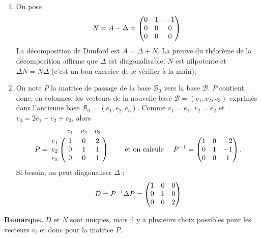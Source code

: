 \documentclass[12pt, class=report,crop=false]{standalone}
\begin{document}
\begin{exemple}
\begin{enumerate}
  \item  On pose 
  $$N = A - \Delta
  = \begin{pmatrix}0&1&-1\cr 0&0&0\cr 0&0&0\end{pmatrix}.$$
  La décomposition de Dunford est $A = \Delta + N$. 
  La preuve du théorème de la décomposition affirme que $\Delta$ est diagonalisable,
  $N$ est nilpotente et $\Delta N = N \Delta$ (c'est un bon exercice de le vérifier
  à la main).
  
  \item On note $P$ la matrice de passage de la base $\mathcal{B}_0$ vers la base $\mathcal{B}$. $P$ contient donc, en colonnes, les vecteurs de la nouvelle base $\mathcal{B} = (v_1,v_2,v_3)$ exprimés dans l'ancienne base 
 $\mathcal{B}_0 = (e_1,e_2,e_3)$.  Comme
 $v_1 = e_1$, $v_2 = e_2$ et $v_3 =  2e_1+e_2+e_3$, alors
 $$P=\bordermatrix{
    &v_1&v_2&v_3\cr
 e_1&1&0&2\cr  
 e_2&0&1&1\cr 
 e_3&0&0&1}\qquad \text{ et on calcule } \quad P^{-1}=\begin{pmatrix}1&0&-2\cr 0&1&-1\cr 0&0&1\end{pmatrix}.$$
 Si besoin, on peut diagonaliser $\Delta$ : 
 $$D = P^{-1} \Delta P = \begin{pmatrix}1&0&0\cr 0&1&0\cr 0&0&2\end{pmatrix}$$
 
\end{enumerate}
\end{exemple}


\textbf{Remarque.} $D$ et $N$ sont uniques, mais il y a plusieurs choix possibles pour les  vecteurs $v_i$ et donc pour la matrice $P$.


\bigskip
\end{document}
